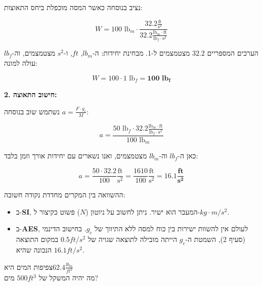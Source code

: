 \documentclass[
  hebrew,
  letterpaper,
  DIV=11,
  numbers=noendperiod]{scrreprt}
\providecommand{\tightlist}{%
  \setlength{\itemsep}{0pt}\setlength{\parskip}{0pt}}
\begin{document}
נציב בנוסחה כאשר המסה מוכפלת ביחס התאוצות:

\[
W = 100 \text{ lb}_m \cdot \frac{32.2 \frac{\text{ft}}{\text{s}^2}}{32.2 \frac{\text{lb}_m \cdot \text{ft}}{\text{lb}_f \cdot \text{s}^2}}
\]

הערכים המספריים \(32.2\) מצטמצמים ל-1. מבחינת יחידות: ה-\(lb_m\),
\(ft\), ו-\(s^2\) מצטמצמים, וה-\(lb_f\) עולה למונה:

\[
W = 100 \cdot 1 \text{ lb}_f = \mathbf{100 \text{ lb}_f}
\]

\textbf{2. חישוב התאוצה:}

נשתמש שוב בנוסחה \(a = \frac{F \cdot g_c}{M}\):

\[
a = \frac{50 \text{ lb}_f \cdot 32.2 \frac{\text{lb}_m \cdot \text{ft}}{\text{lb}_f \cdot \text{s}^2}}{100 \text{ lb}_m}
\]

כאן ה-\(lb_f\) וה-\(lb_m\) מצטמצמים, ואנו נשארים עם יחידות אורך וזמן
בלבד:

\[
a = \frac{50 \cdot 32.2}{100} \frac{\text{ft}}{\text{s}^2} = \frac{1610}{100} \frac{\text{ft}}{\text{s}^2} = \mathbf{16.1 \frac{\text{ft}}{\text{s}^2}}
\]

\begin{tcolorbox}[enhanced jigsaw, colback=white, arc=.35mm, coltitle=black, breakable, toptitle=1mm, leftrule=.75mm, colbacktitle=quarto-callout-tip-color!10!white, opacitybacktitle=0.6, bottomtitle=1mm, titlerule=0mm, opacityback=0, colframe=quarto-callout-tip-color-frame, title=\textcolor{quarto-callout-tip-color}{\faLightbulb}\hspace{0.5em}{תובנה לסיכום}, rightrule=.15mm, bottomrule=.15mm, toprule=.15mm, left=2mm]

ההשוואה בין המקרים מחדדת נקודה חשובה:

\begin{itemize}
\tightlist
\item
  ב-\textbf{SI}, המעבר הוא ישיר. ניתן לחשוב על ניוטון (\(N\)) פשוט
  כקיצור ל-\(kg \cdot m/s^2\).
\item
  ב-\textbf{AES}, לעולם אין להשוות ישירות בין כוח למסה ללא התיווך של
  \(g_c\). בחישוב הדינמי (סעיף 2), השמטת ה-\(g_c\) הייתה מובילה לתוצאה
  שגויה של \(0.5 ft/s^2\) במקום התוצאה הנכונה שהיא \(16.1 ft/s^2\).
\end{itemize}

\end{tcolorbox}

{צפיפות המים היא}\(62.4\frac{lb_{m}}{ft^{3}}\)\\
{מה יהיה המשקל של} \(500ft^{3}\) {מים?}
\end{document}
